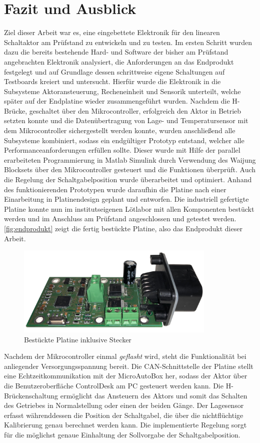 \chapter{Fazit und Ausblick}\label{kap8}
Ziel dieser Arbeit war es, eine eingebettete Elektronik für den linearen Schaltaktor am Prüfstand zu entwickeln und zu testen. Im ersten Schritt wurden dazu die bereits bestehende Hard- und Software der bisher am Prüfstand angebrachten Elektronik analysiert, die Anforderungen an das Endprodukt festgelegt und auf Grundlage dessen schrittweise eigene Schaltungen auf Testboards kreiert und untersucht. Hierfür wurde die Elektronik in die Subsysteme Aktoransteuerung, Recheneinheit und Sensorik unterteilt, welche später auf der Endplatine wieder zusammengeführt wurden. Nachdem die H-Brücke, geschaltet über den Mikrocontroller, erfolgreich den Aktor in Betrieb setzten konnte und die Datenübertragung von Lage- und Temperatursensor mit dem Mikrocontroller sichergestellt werden konnte, wurden anschließend alle Subsysteme kombiniert, sodass ein endgültiger Prototyp entstand, welcher alle Performanceanforderungen erfüllen sollte. Dieser wurde mit Hilfe der parallel erarbeiteten Programmierung in Matlab Simulink durch Verwendung des Waijung Blocksets über den Mikrocontroller gesteuert und die Funktionen überprüft. Auch die Regelung der Schaltgabelposition wurde überarbeitet und optimiert.
Anhand des funktionierenden Prototypen wurde daraufhin die Platine nach einer Einarbeitung in Platinendesign geplant und entworfen. Die industriell gefertigte Platine konnte nun im institutseigenen Lötlabor mit allen Komponenten bestückt werden und im Anschluss am Prüfstand angeschlossen und getestet werden. \autoref{fig:endprodukt} zeigt die fertig bestückte Platine, also das Endprodukt dieser Arbeit.
\begin{figure}[h]
\centering
\includegraphics[width=270pt]{./Bilder/Endprodukt.pdf}
\caption{Bestückte Platine inklusive Stecker}
\label{fig:endprodukt}
\end{figure} \noindent
Nachdem der Mikrocontroller einmal \textit{geflasht} wird, steht die Funktionalität bei anliegender Versorgungsspannung bereit. Die CAN-Schnittstelle der Platine stellt eine Echtzeitkommunikation mit der MicroAutoBox her, sodass der Aktor über die Benutzeroberfläche ControlDesk am PC gesteuert werden kann. Die H-Brückenschaltung ermöglicht das Ansteuern des Aktors und somit das Schalten des Getriebes in Normalstellung oder einen der beiden Gänge. Der Lagesensor erfasst währenddessen die Position der Schaltgabel, die über die nichtflüchtige Kalibrierung genau berechnet werden kann. Die implementierte Regelung sorgt für die möglichst genaue Einhaltung der Sollvorgabe der Schaltgabelposition.
